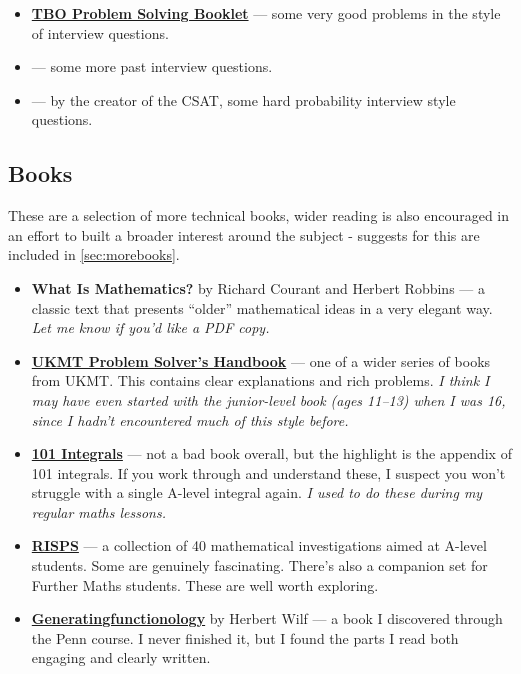 \documentclass[11pt]{article}
\begin{document}
\begin{itemize}

\item \href{https://www.drfrost.org/uploads/users/1/r261/TBO\%20Problem\%20Solving\%20Booklet.pdf}{\textbf{TBO Problem Solving Booklet}} --- some very good problems in the style of interview questions. 

\item {} --- some more past interview questions.

\item {} --- by the creator of the CSAT, some hard probability interview style questions.

\end{itemize}

\subsection{Books}

These are a selection of more technical books, wider reading is also encouraged in an effort to built a broader interest around the subject - suggests for this are included in \cref{sec:morebooks}.

\begin{itemize}
\item \textbf{What Is Mathematics?} by Richard Courant and Herbert Robbins — a classic text that presents “older” mathematical ideas in a very elegant way. \emph{Let me know if you’d like a PDF copy.}

\item \href{https://ukmt.org.uk/product/a-problem-solvers-handbook}{\textbf{UKMT Problem Solver’s Handbook}} — one of a wider series of books from UKMT. This contains clear explanations and rich problems. \emph{I think I may have even started with the junior-level book (ages 11–13) when I was 16, since I hadn’t encountered much of this style before.}

\item \href{https://isaacphysics.org/books/pre_uni_maths_2e}{\textbf{101 Integrals}} — not a bad book overall, but the highlight is the appendix of 101 integrals. If you work through and understand these, I suspect you won’t struggle with a single A-level integral again. \emph{I used to do these during my regular maths lessons.}
  
\item \href{https://www.risps.co.uk/}{\textbf{RISPS}} — a collection of 40 mathematical investigations aimed at A-level students. Some are genuinely fascinating. There's also a companion set for Further Maths students. These are well worth exploring.
  

\item \href{https://www2.math.upenn.edu/~wilf/gfologyLinked2.pdf}{\textbf{Generatingfunctionology}} by Herbert Wilf — a book I discovered through the Penn course. I never finished it, but I found the parts I read both engaging and clearly written.
\end{itemize}
\end{document}
